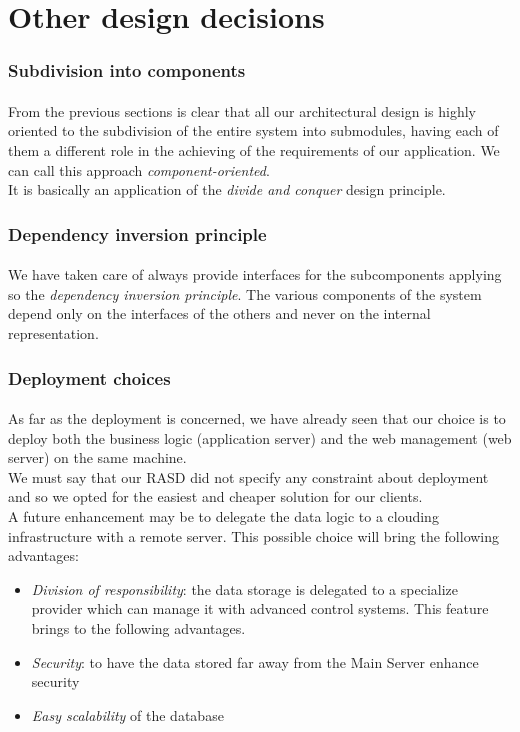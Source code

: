 \section{Other design decisions}
\subsubsection{Subdivision into components}
\paragraph{}From the previous sections is clear that all our architectural design is highly oriented to the subdivision of the entire system into submodules, having each of them a different role in the achieving of the requirements of our application. We can call this approach \textit{component-oriented}.\\
It is basically an application of the \textit{divide and conquer} design principle.

\subsubsection{Dependency inversion principle}
\paragraph{} We have taken care of always provide interfaces for the subcomponents applying so the \textit{dependency inversion principle}. The various components of the system depend only on the interfaces of the others and never on the internal representation.

\subsubsection{Deployment choices}
\paragraph{} As far as the deployment is concerned, we have already seen that our choice is to deploy both the business logic (application server) and the web management (web server) on the same machine.\\ We must say that our RASD did not specify any constraint about deployment and so we opted for the easiest and cheaper solution for our clients.\\ A future enhancement may be to delegate the data logic to a clouding infrastructure with a remote server. This possible choice will bring the following advantages:
\begin{itemize}
	\item \textit{Division of responsibility}: the data storage is delegated to a specialize provider which can manage it with advanced control systems. This feature brings to the following advantages.
	\item \textit{Security}: to have the data stored far away from the Main Server enhance security
	\item \textit{Easy scalability} of the database 
\end{itemize}

